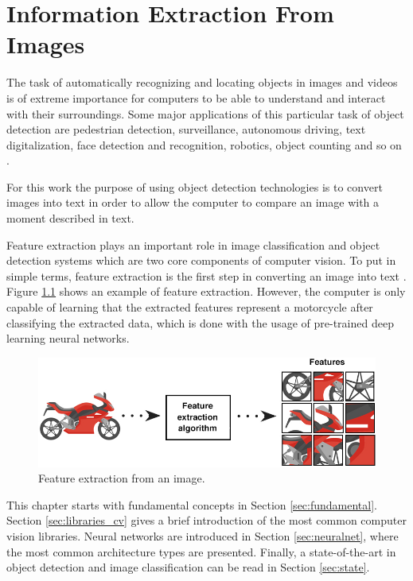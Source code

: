 \cleardoublepage


\chapter{Information Extraction From Images}
\label{ch:computervision}



The task of automatically recognizing and locating objects in images and videos is of extreme importance for computers to be able to understand and interact with their surroundings. Some major applications of this particular task of object detection are pedestrian detection, surveillance, autonomous driving, text digitalization, face detection and recognition, robotics, object counting and so on \cite{Agarwal2019}. 

For this work the purpose of using object detection technologies is to convert images into text in order to allow the computer to compare an image with a moment described in text.

Feature extraction plays an important role in image classification and object detection systems which are two core components of computer vision. To put in simple terms, feature extraction is the first step in converting an image into text \cite{Tiwari2013}. Figure \ref{fig:feature_extraction} shows an example of feature extraction. However, the computer is only capable of learning that the extracted features represent a motorcycle after classifying the extracted data, which is done with the usage of pre-trained deep learning neural networks.





\begin{figure}[H]
    \centering
    \includegraphics[scale = 0.55]{Sections/2StateOfTheArt/2_images/Feature_extraction.png}
    \caption{Feature extraction from an image. \cite{feature} }  
    \label{fig:feature_extraction}
\end{figure}


\par This chapter starts with fundamental concepts in Section \ref{sec:fundamental}. Section \ref{sec:libraries_cv} gives a brief introduction of the most common computer vision libraries. Neural networks are introduced in Section \ref{sec:neuralnet}, where the most common architecture types are presented. Finally, a state-of-the-art in object detection and image classification can be read in Section \ref{sec:state}.

